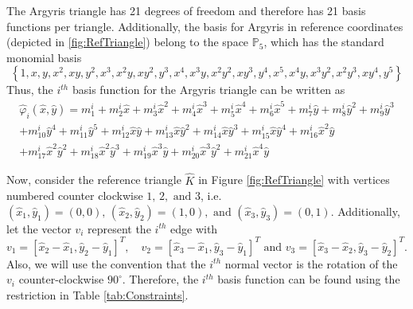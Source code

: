 

The Argyris triangle has 21 degrees of freedom and therefore has 21 basis
functions per triangle.  Additionally, the basis for Argyris in reference
coordinates (depicted in \autoref{fig:RefTriangle}) belong to the space
$\mathbb{P}_5$, which has the standard monomial basis
\begin{equation*}
	\left\{
    1, x, y, x^2, xy, y^2, x^3, x^2y, xy^2, y^3, x^4, x^3y,
    x^2y^2, xy^3, y^4, x^5, x^4y, x^3y^2, x^2y^3, xy^4, y^5
  \right\}
\end{equation*}
Thus, the $i^{th}$ basis function for the Argyris triangle can be written as
\begin{equation}
	\begin{split}
	\hat{\varphi}_i(\hat{x},\hat{y}) = m^i_1 + m^i_2 \hat{x} + m^i_3 \hat{x}^2 + m^i_4 \hat{x}^3 + m^i_5 \hat{x}^4 + m^i_6 \hat{x}^5 + m^i_7 \hat{y} + m^i_8
 	\hat{y}^2 + m^i_9 \hat{y}^3 \\
 + m^i_{10} \hat{y}^4 + m^i_{11} \hat{y}^5 + m^i_{12}  \hat{x} \hat{y} + m^i_{13} \hat{x} \hat{y}^2 + m^i_{14} \hat{x} \hat{y}^3 + m^i_{15}
 	\hat{x} \hat{y}^4 + m^i_{16} \hat{x}^2 \hat{y} \\
 + m^i_{17} \hat{x}^2 \hat{y}^2 + m^i_{18}\hat{x}^2 \hat{y}^3 + m^i_{19} \hat{x}^3 \hat{y} + m^i_{20}\hat{x}^3 \hat{y}^2 + m^i_{21} \hat{x}^4 \hat{y}
 \end{split}
	\label{eqn:Basis}
\end{equation}

Now, consider the reference triangle $\hat{K}$ in Figure \ref{fig:RefTriangle} with
vertices numbered counter clockwise $1,\, 2,\text{ and } 3$, i.e.
$(\hat{x}_1,\hat{y}_1)=(0,0),\, (\hat{x}_2,\hat{y}_2)=(1,0),\text{ and } (\hat{x}_3,\hat{y}_3)=(0,1)$.
Additionally, let the vector $v_i$ represent the $i^{th}$ edge with
\begin{equation*}
  v_1 = [\hat{x}_2-\hat{x}_1,\hat{y}_2-\hat{y}_1]^T, \quad v_2=[\hat{x}_3-\hat{x}_1,\hat{y}_3-\hat{y}_1]^T \text{ and } v_3=[\hat{x}_3
  -\hat{x}_2,\hat{y}_3-\hat{y}_2]^T.
\end{equation*}
Also, we will use the convention that the $i^{th}$ normal vector is the rotation
of the $v_i$ counter-clockwise $90^\circ$. Therefore, the $i^{th}$ basis
function can be found using the restriction in Table \ref{tab:Constraints}.

